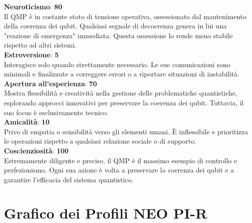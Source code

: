 \textbf{Neuroticismo}: \textbf{80} \\
Il QMP è in costante stato di tensione operativa, ossessionato dal mantenimento della coerenza dei qubit. Qualsiasi segnale di decoerenza genera in lui una "reazione di emergenza" immediata. Questa ossessione lo rende meno stabile rispetto ad altri sistemi. \\

\textbf{Estroversione}: \textbf{5} \\
Interagisce solo quando strettamente necessario. Le sue comunicazioni sono minimali e finalizzate a correggere errori o a riportare situazioni di instabilità. \\

\textbf{Apertura all’esperienza}: \textbf{70} \\
Mostra flessibilità e creatività nella gestione delle problematiche quantistiche, esplorando approcci innovativi per preservare la coerenza dei qubit. Tuttavia, il suo focus è esclusivamente tecnico. \\

\textbf{Amicalità}: \textbf{10} \\
Privo di empatia o sensibilità verso gli elementi umani. È inflessibile e prioritizza le operazioni rispetto a qualsiasi relazione sociale o di supporto. \\

\textbf{Coscienziosità}: \textbf{100} \\
Estremamente diligente e preciso, il QMP è il massimo esempio di controllo e perfezionismo. Ogni sua azione è volta a preservare la coerenza dei qubit e a garantire l’efficacia del sistema quantistico.

\newpage

\section*{Grafico dei Profili NEO PI-R}


